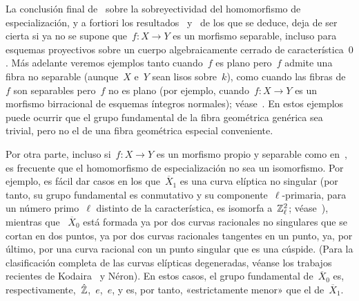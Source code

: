 \begin{remarques}
\label{X.2.5}
La conclusión final de~ sobre la sobreyectividad del homomorfismo de
especialización, y a fortiori los resultados~ y~ de los
que se deduce, deja de ser cierta si ya no se supone que~$f\colon X\to Y$ es
un morfismo separable, incluso para esquemas proyectivos sobre un cuerpo
algebraicamente cerrado de característica~$0$. Más adelante veremos ejemplos
tanto cuando~$f$ es plano pero~$f$ admite una fibra no separable (aunque~$X$
e~$Y$ sean lisos sobre~$k$), como cuando las fibras de~$f$ son separables pero~$f$ no
es plano (por ejemplo, cuando~$f\colon X\to Y$ es un morfismo birracional de
esquemas íntegros normales); véase~. En estos ejemplos puede
ocurrir que el grupo fundamental de la fibra geométrica genérica sea trivial,
pero no el de una fibra geométrica especial conveniente.

Por otra parte, incluso si~$f\colon X\to Y$ es un morfismo propio y separable
como en~, es frecuente que el homomorfismo de especialización no sea
un isomorfismo. Por ejemplo, es fácil dar casos en los que~$\overline X_1$ es
una curva elíptica no singular (por tanto, su grupo fundamental es conmutativo
y su componente~$\ell$-primaria, para un número primo~$\ell$ distinto de la
característica, es isomorfa a~$\mathbb Z_\ell^2$; véase~), mientras que
~$\overline X_0$ está formada ya por dos curvas racionales no singulares que se
cortan en dos puntos, ya por dos curvas racionales tangentes en un punto, ya,
por último, por una curva racional con un punto singular que es una cúspide.
(Para la clasificación completa de las curvas elípticas degeneradas, véanse
los trabajos recientes de Kodaira~\cite{X.1} y Néron). En estos casos, el grupo
fundamental de~$\overline X_0$ es, respectivamente,~$\hat{\mathbb Z}$,~$e$,~$e$, y es,
por tanto, «estrictamente menor» que el de~$\overline X_1$.


\end{remarques}
